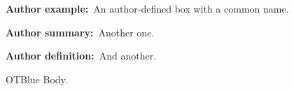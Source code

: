 \documentclass{article}
\newenvironment{examplebox}{\par\textbf{Author example:}\ }{\par}
\newenvironment{summarybox}{\par\textbf{Author summary:}\ }{\par}
\newenvironment{definitionbox}{\par\textbf{Author definition:}\ }{\par}
\begin{document}

\begin{examplebox}An author-defined box with a common name.\end{examplebox}
\begin{summarybox}Another one.\end{summarybox}
\begin{definitionbox}And another.\end{definitionbox}

\begin{otscibox}{OTBlue}
  Body.
\end{otscibox}
\end{document}
